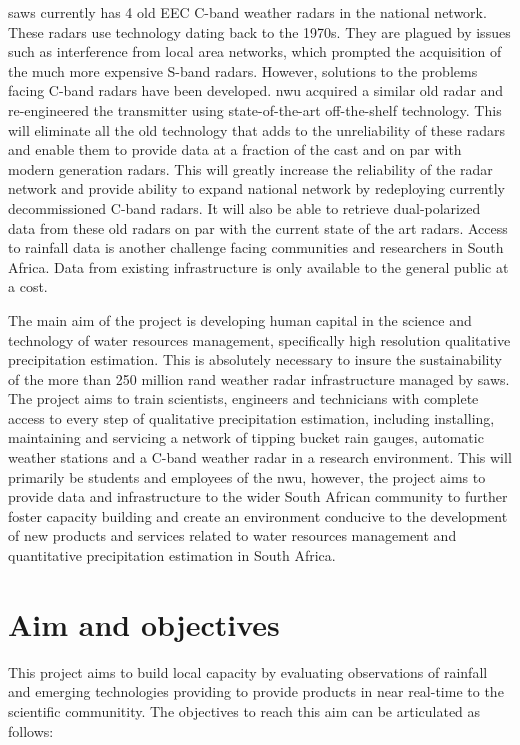 \documentclass{wrcreport}
\begin{document}
\gls{saws} currently has 4 old EEC C-band weather radars in the
national network. These radars use technology dating back to the
1970s. They are plagued by issues such as interference from local area
networks, which prompted the acquisition of the much more expensive
S-band radars. However, solutions to the problems facing C-band
radars have been developed. \gls{nwu} acquired a similar old radar and
re-engineered the transmitter using state-of-the-art off-the-shelf
technology. This will eliminate all the old technology that adds to
the unreliability of these radars and enable them to provide data at a
fraction of the cast and on par with modern generation radars. This
will greatly increase the reliability of the radar network and provide
ability to expand national network by redeploying currently
decommissioned C-band radars. It will also be able to retrieve
dual-polarized data from these old radars on par with the current
state of the art radars. Access to rainfall data is another challenge
facing communities and researchers in South Africa. Data from existing
infrastructure is only available to the general public at a cost.

The main aim of the project is developing human capital in the science
and technology of water resources management, specifically high
resolution qualitative precipitation estimation. This is absolutely
necessary to insure the sustainability of the more than 250 million
rand weather radar infrastructure managed by \gls{saws}. The project
aims to train scientists, engineers and technicians with complete
access to every step of qualitative precipitation estimation,
including installing, maintaining and servicing a network of tipping
bucket rain gauges, automatic weather stations and a C-band weather
radar in a research environment. This will primarily be students and
employees of the \gls{nwu}, however, the project aims to provide data
and infrastructure to the wider South African community to further
foster capacity building and create an environment conducive to the
development of new products and services related to water resources
management and quantitative precipitation estimation in South Africa. 

\section{Aim and objectives}
\label{sec:obj}

This project aims to build local capacity by evaluating observations of rainfall and emerging technologies providing to provide products in near real-time to the scientific communitity. The objectives to reach this aim can be articulated as follows:
\end{document}
